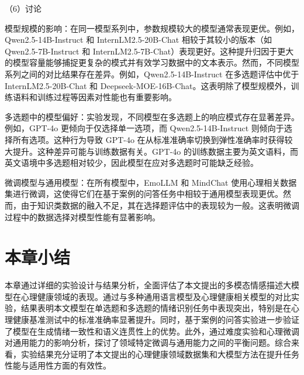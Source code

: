 （6）讨论

模型规模的影响：在同一模型系列中，参数规模较大的模型通常表现更优。例如，Qwen2.5-14B-Instruct 和 InternLM2.5-20B-Chat 相较于其较小的版本（如 Qwen2.5-7B-Instruct 和 InternLM2.5-7B-Chat）表现更好。这种提升归因于更大的模型容量能够捕捉更复杂的模式并有效学习数据中的文本表示。然而，不同模型系列之间的对比结果存在差异。例如，Qwen2.5-14B-Instruct 在多选题评估中优于 InternLM2.5-20B-Chat 和 Deepseek-MOE-16B-Chat。这表明除了模型规模外，训练语料和训练过程等因素对性能也有重要影响。

多选题中的模型偏好：实验发现，不同模型在多选题上的响应模式存在显著差异。例如，GPT-4o 更倾向于仅选择单一选项，而 Qwen2.5-14B-Instruct 则倾向于选择所有选项。这种行为导致 GPT-4o 在从标准准确率切换到弹性准确率时获得较大提升。这种差异可能与训练数据有关。GPT-4o 的训练数据主要为英文语料，而英文语境中多选题相对较少，因此模型在应对多选题时可能缺乏经验。

微调模型与通用模型：在所有模型中，EmoLLM 和 MindChat 使用心理相关数据集进行微调，这使得它们在基于案例的问答任务中相较于通用模型表现更优。然而，由于知识类数据的融入不足，其在选择题评估中的表现较为一般。这表明微调过程中的数据选择对模型性能有显著影响。

\section{本章小结}

本章通过详细的实验设计与结果分析，全面评估了本文提出的多模态情感描述大模型在心理健康领域的表现。通过与多种通用语言模型及心理健康相关模型的对比实验，结果表明本文模型在单选题和多选题的情绪识别任务中表现突出，特别是在心理健康基准测试中的标准准确率显著提升。同时，基于案例的问答实验进一步验证了模型在生成情绪一致性和语义连贯性上的优势。此外，通过难度实验和心理微调对通用能力的影响分析，探讨了领域特定微调与通用能力之间的平衡问题。综合来看，实验结果充分证明了本文提出的心理健康领域数据集和大模型方法在提升任务性能与适用性方面的有效性。
